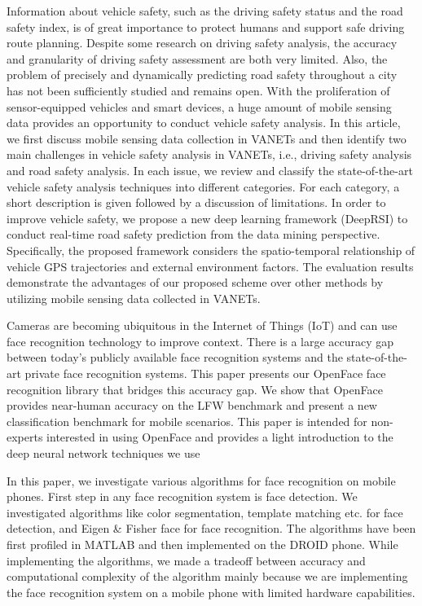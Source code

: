 \documentclass{article}
\begin{document}
\medskip
Information about vehicle safety, such as the driving safety status and the road safety index, is of great importance to protect humans and support safe driving route planning. Despite some research on driving safety analysis, the accuracy and granularity of driving safety assessment are both very limited. Also, the problem of precisely and dynamically predicting road safety throughout a city has not been sufficiently studied and remains open. With the proliferation of sensor-equipped vehicles and smart devices, a huge amount of mobile sensing data provides an opportunity to conduct vehicle safety analysis. In this article, we first discuss mobile sensing data collection in VANETs and then identify two main challenges in vehicle safety analysis in VANETs, i.e., driving safety analysis and road safety analysis. In each issue, we review and classify the state-of-the-art vehicle safety analysis techniques into different categories. For each category, a short description is given followed by a discussion of limitations. In order to improve vehicle safety, we propose a new deep learning framework (DeepRSI) to conduct real-time road safety prediction from the data mining perspective. Specifically, the proposed framework considers the spatio-temporal relationship of vehicle GPS trajectories and external environment factors. The evaluation results demonstrate the advantages of our proposed scheme over other methods by utilizing mobile sensing data collected in VANETs.\cite{peng2018vehicle}

\medskip

Cameras are becoming ubiquitous in the Internet of Things (IoT) and can use face recognition technology to improve context. There is a large accuracy gap between today’s publicly available face
recognition systems and the state-of-the-art private face recognition systems. This paper presents
our OpenFace face recognition library that bridges this accuracy gap. We show that OpenFace provides near-human accuracy on the LFW benchmark and present a new classification benchmark
for mobile scenarios. This paper is intended for non-experts interested in using OpenFace and
provides a light introduction to the deep neural network techniques we use\cite{amos2016openface}

\medskip

In this paper, we investigate various algorithms for
face recognition on mobile phones. First step in any face
recognition system is face detection. We investigated
algorithms like color segmentation, template matching etc. for
face detection, and Eigen & Fisher face for face recognition.
The algorithms have been first profiled in MATLAB and then
implemented on the DROID phone. While implementing the
algorithms, we made a tradeoff between accuracy and
computational complexity of the algorithm mainly because we
are implementing the face recognition system on a mobile
phone with limited hardware capabilities. \cite{dave2010face}
\end{document}
